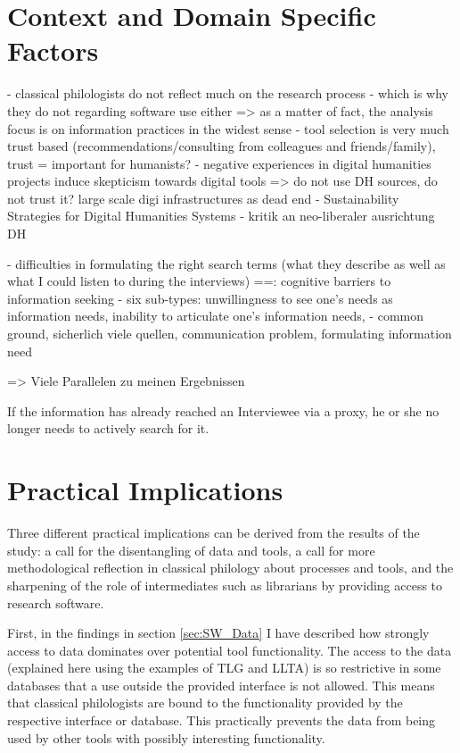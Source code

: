 \documentclass[12pt, a4paper, titlepage, oneside, abstract=true, toc=listof, toc=bibliography, BCOR=1cm]{scrreprt}
\begin{document}
{\section{Context and Domain Specific Factors}
\label{sec:Disc_Context}
- classical philologists do not reflect much on the research process - which is why they do not regarding software use either => as a matter of fact, the analysis focus is on information practices in the widest sense
- tool selection is very much trust based (recommendations/consulting from colleagues and friends/family), trust = important for humanists?
- negative experiences in digital humanities projects induce skepticism towards digital tools => do not use DH sources, do not trust it?
\cite{Zundert2012} large scale digi infrastructures as dead end
\cite{Neuefeind2020} - Sustainability Strategies for Digital Humanities Systems
\citep{Barker2012} - kritik an neo-liberaler ausrichtung DH

- difficulties in formulating the right search terms (what they describe as well as what I could listen to during the interviews)
==\cite{Savolainen2015a}: cognitive barriers to information seeking - six sub-types: unwillingness to see one’s needs as information needs, inability to articulate one’s information needs,  - common ground, sicherlich viele quellen, communication problem, formulating information need

\citep{Bulger2011} => Viele Parallelen zu meinen Ergebnissen

If the information has already reached an Interviewee via a proxy, he or she no longer needs to actively search for it.

\section{Practical Implications}
\label{sec:Disc_PI}
Three different practical implications can be derived from the results of the study: a call for the disentangling of data and tools, a call for more methodological reflection in classical philology about processes and tools, and the sharpening of the role of intermediates such as librarians by providing access to research software.
 
First, in the findings in section \ref{sec:SW_Data} I have described how strongly access to data dominates over potential tool functionality. The access to the data (explained here using the examples of TLG and LLTA) is so restrictive in some databases that a use outside the provided interface is not allowed. This means that classical philologists are bound to the functionality provided by the respective interface or database. This practically prevents the data from being used by other tools with possibly interesting functionality. 

}
\end{document}
